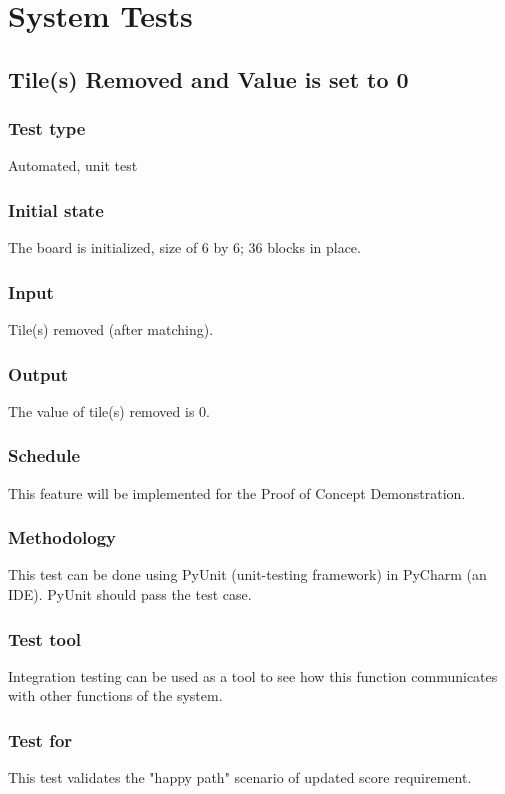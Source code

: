 \documentclass[12pt]{article}
\begin{document}
\newpage
%
%

\section{System Tests}
\subsection{Tile(s) Removed and Value is set to 0}
\subsubsection{Test type}
Automated, unit test
\subsubsection{Initial state}
The board is initialized, size of 6 by 6; 36 blocks in place.
\subsubsection{Input}
Tile(s) removed (after matching).
\subsubsection{Output}
The value of tile(s) removed is 0.
\subsubsection{Schedule}
This feature will be implemented for the Proof of Concept Demonstration.
\subsubsection{Methodology}
This test can be done using PyUnit (unit-testing framework) in PyCharm (an IDE). PyUnit should pass the test case.
\subsubsection{Test tool}
Integration testing can be used as a tool to see how this function communicates with other functions of the system.
\subsubsection{Test for}
This test validates the "happy path" scenario of updated score requirement. 
\end{document}
